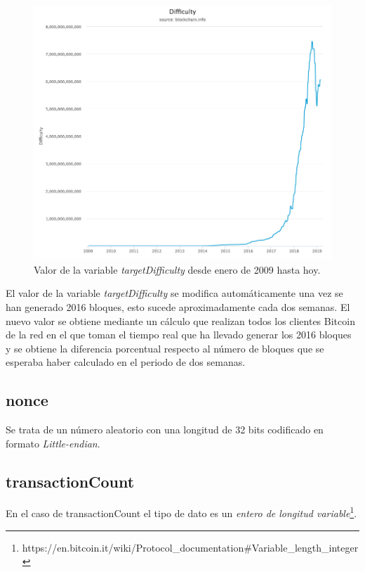 \documentclass{article}
\begin{document}
    \begin{figure}[H]
    \centering
        \includegraphics[scale=0.39]{img/Bitcoin_TargetDifficulty.png}
        \caption{Valor de la variable \textit{targetDifficulty} desde enero de 2009 hasta hoy.}
    \end{figure}
    
    El valor de la variable \textit{targetDifficulty} se modifica automáticamente una vez se han generado 2016 bloques, esto sucede aproximadamente cada dos semanas. El nuevo valor se obtiene mediante un cálculo que realizan todos los clientes Bitcoin de la red en el que toman el tiempo real que ha llevado generar los 2016 bloques y se obtiene la diferencia porcentual respecto al número de bloques que se esperaba haber calculado en el periodo de dos semanas.
    
    \subsection{nonce}
    Se trata de un número aleatorio con una longitud de 32 bits codificado en formato \textit{Little-endian}.
    
    \subsection{transactionCount}
    En el caso de transactionCount el tipo de dato es un \textit{entero de longitud variable}\footnote{https://en.bitcoin.it/wiki/Protocol\_documentation\#Variable\_length\_integer}.
    
\end{document}
